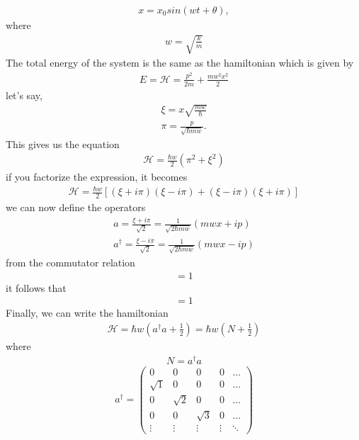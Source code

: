 \documentclass[12pt]{article}
\begin{document}
\begin{gather}
x=x_0 sin(wt + \theta),
\end{gather}
where
\begin{gather}
w=\sqrt{\frac{k}{m}}
\end{gather}
The total energy of the system is the same as the hamiltonian which is given by
\begin{gather}
E = \mathcal{H} = \frac{p^2}{2m} + \frac{mw^2x^2}{2}
\end{gather}
let's say, 
\begin{gather}
\xi = x \sqrt{\frac{mw}{\hbar}} \\
\pi = \frac{p}{\sqrt{\hbar mw}}. 
\end{gather}
This gives us the equation
\begin{gather}
\mathcal{H} = \frac{\hbar w}{2}(\pi^2+\xi^2)
\end{gather}
if you factorize the expression, it becomes
\begin{gather}
\mathcal{H} = \frac{\hbar w}{2}[(\xi + i \pi)(\xi - i \pi) + (\xi - i \pi)(\xi + i \pi)]
\end{gather}
we can now define the operators
\begin{gather}
a = \frac{\xi + i \pi}{\sqrt{2}} = \frac{1}{\sqrt{2 \hbar m w}}(mwx + ip) \\
a^\dagger = \frac{\xi - i \pi}{\sqrt{2}} = \frac{1}{\sqrt{2 \hbar m w}}(mwx - ip)
\end{gather}
from the commutator relation
\begin{gather}
[i \pi,\xi] = 1
\end{gather}
it follows that
\begin{gather}
[a,a^\dagger] = 1
\end{gather}
Finally, we can write the hamiltonian
\begin{gather}
\mathcal{H} = \hbar w (a^\dagger a + \frac{1}{2}) = \hbar w (N + \frac{1}{2})
\label{hamil}
\end{gather}
where
\begin{gather}
N = a^\dagger a
\end{gather}
\[ a^\dagger = \left( \begin{array}{ccccc}
0 & 0 & 0 & 0 & \ldots \\
\sqrt{1} & 0 & 0 & 0 & \ldots \\
0 & \sqrt{2} & 0 & 0 & \ldots \\
0 & 0 & \sqrt{3} & 0 & \ldots \\
\vdots & \vdots & \vdots & \vdots & \ddots \end{array} \right)\]
\end{document}
